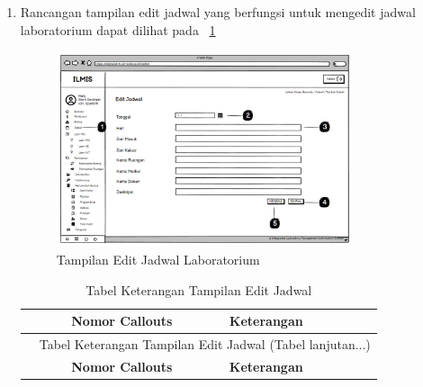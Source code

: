 \begin{enumerate}
	\item Rancangan tampilan edit jadwal yang berfungsi untuk mengedit jadwal laboratorium dapat dilihat pada \pic~\ref{fig:edit-jadwal}
	      \begin{figure}
		      \centering
		      \includegraphics[width=0.82\textwidth]{konten/gambar/user interface/edit-jadwal.png}
		      \caption{Tampilan Edit Jadwal Laboratorium}
		      \label{fig:edit-jadwal}
	      \end{figure}

	      \begin{longtable}{c p{}}
		      \caption{Tabel Keterangan Tampilan Edit Jadwal}
		      \label{tab:edit-jadwal}                                                                                                                                                                 \\
		      \hline
		      \textbf{Nomor Callouts} & \textbf{Keterangan}                                                                                                                                           \\
		      \hline
		      \endfirsthead

		      \multicolumn{2}{c}{\small\tablename\ \thetable\ {Tabel Keterangan Tampilan Edit Jadwal} \space (Tabel lanjutan...)}                                                                     \\
		      \hline
		      \textbf{Nomor Callouts} & \textbf{Keterangan}                                                                                                                                           \\
		      \hline
		      \endhead


\end{longtable}
\end{enumerate}
